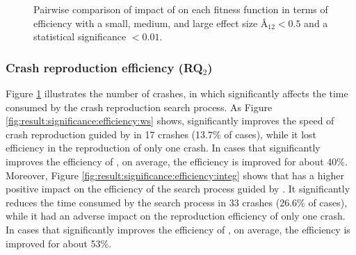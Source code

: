 \begin{figure}[t]
    \hfil 
    \hfil
    \caption{Pairwise comparison of impact of \bbc on each fitness function in terms of efficiency with a small, medium, and large effect size $\textit{\^{A}}_{12} < 0.5$ and a statistical significance $<0.01$.}
    \label{fig:result:significance:efficiency}
\end{figure}
\subsubsection{Crash reproduction efficiency (RQ$_2$)}

Figure \ref{fig:result:significance:efficiency} illustrates the number of crashes, in which \bbc significantly affects the time consumed by the crash reproduction search process. As Figure \ref{fig:result:significance:efficiency:ws} shows, \bbc significantly improves the speed of crash reproduction guided by \WS in 17 crashes (13.7\% of cases), while it lost efficiency in the reproduction of only one crash. In cases that \bbc significantly improves the efficiency of \WS, on average, the efficiency is improved for about 40\%.
Moreover,  Figure \ref{fig:result:significance:efficiency:integ} shows that \bbc has a higher positive impact on the efficiency of the search process guided by \integ. It significantly reduces the time consumed by the search process in 33 crashes (26.6\% of cases), while it had an adverse impact on the reproduction efficiency of only one crash. In cases that \bbc significantly improves the efficiency of \integ, on average, the efficiency is improved for about 53\%.

